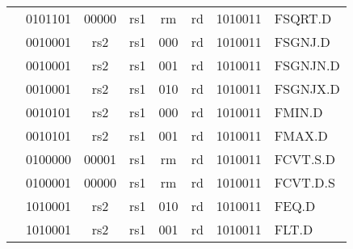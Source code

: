 \begin{table}[p]
\begin{small}
\begin{center}
\begin{tabular}{p{0in}p{0.4in}p{0.05in}p{0.05in}p{0.05in}p{0.05in}p{0.4in}p{0.6in}p{0.4in}p{0.6in}p{0.7in}l}
&
\multicolumn{4}{|c|}{0101101} &
\multicolumn{2}{c|}{00000} &
\multicolumn{1}{c|}{rs1} &
\multicolumn{1}{c|}{rm} &
\multicolumn{1}{c|}{rd} &
\multicolumn{1}{c|}{1010011} & FSQRT.D \\
\cline{2-11}


&
\multicolumn{4}{|c|}{0010001} &
\multicolumn{2}{c|}{rs2} &
\multicolumn{1}{c|}{rs1} &
\multicolumn{1}{c|}{000} &
\multicolumn{1}{c|}{rd} &
\multicolumn{1}{c|}{1010011} & FSGNJ.D \\
\cline{2-11}


&
\multicolumn{4}{|c|}{0010001} &
\multicolumn{2}{c|}{rs2} &
\multicolumn{1}{c|}{rs1} &
\multicolumn{1}{c|}{001} &
\multicolumn{1}{c|}{rd} &
\multicolumn{1}{c|}{1010011} & FSGNJN.D \\
\cline{2-11}


&
\multicolumn{4}{|c|}{0010001} &
\multicolumn{2}{c|}{rs2} &
\multicolumn{1}{c|}{rs1} &
\multicolumn{1}{c|}{010} &
\multicolumn{1}{c|}{rd} &
\multicolumn{1}{c|}{1010011} & FSGNJX.D \\
\cline{2-11}


&
\multicolumn{4}{|c|}{0010101} &
\multicolumn{2}{c|}{rs2} &
\multicolumn{1}{c|}{rs1} &
\multicolumn{1}{c|}{000} &
\multicolumn{1}{c|}{rd} &
\multicolumn{1}{c|}{1010011} & FMIN.D \\
\cline{2-11}


&
\multicolumn{4}{|c|}{0010101} &
\multicolumn{2}{c|}{rs2} &
\multicolumn{1}{c|}{rs1} &
\multicolumn{1}{c|}{001} &
\multicolumn{1}{c|}{rd} &
\multicolumn{1}{c|}{1010011} & FMAX.D \\
\cline{2-11}


&
\multicolumn{4}{|c|}{0100000} &
\multicolumn{2}{c|}{00001} &
\multicolumn{1}{c|}{rs1} &
\multicolumn{1}{c|}{rm} &
\multicolumn{1}{c|}{rd} &
\multicolumn{1}{c|}{1010011} & FCVT.S.D \\
\cline{2-11}


&
\multicolumn{4}{|c|}{0100001} &
\multicolumn{2}{c|}{00000} &
\multicolumn{1}{c|}{rs1} &
\multicolumn{1}{c|}{rm} &
\multicolumn{1}{c|}{rd} &
\multicolumn{1}{c|}{1010011} & FCVT.D.S \\
\cline{2-11}


&
\multicolumn{4}{|c|}{1010001} &
\multicolumn{2}{c|}{rs2} &
\multicolumn{1}{c|}{rs1} &
\multicolumn{1}{c|}{010} &
\multicolumn{1}{c|}{rd} &
\multicolumn{1}{c|}{1010011} & FEQ.D \\
\cline{2-11}


&
\multicolumn{4}{|c|}{1010001} &
\multicolumn{2}{c|}{rs2} &
\multicolumn{1}{c|}{rs1} &
\multicolumn{1}{c|}{001} &
\multicolumn{1}{c|}{rd} &
\multicolumn{1}{c|}{1010011} & FLT.D \\
\cline{2-11}



\end{tabular}
\end{center}
\end{small}
\end{table}
